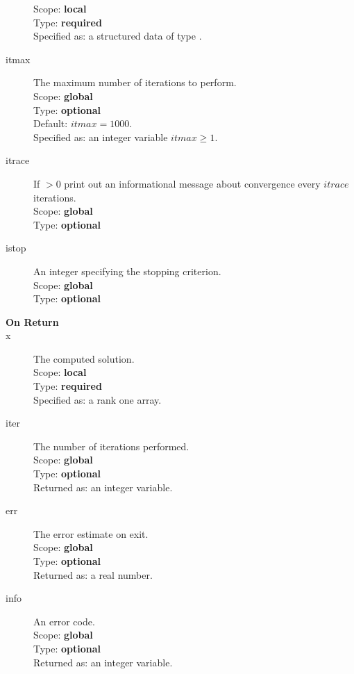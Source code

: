 \begin{description}
Scope: {\bf local} \\
Type: {\bf required}\\
Specified as: a structured data of type \descdata.
\item[itmax]  The maximum number of iterations to perform.\\
Scope: {\bf global} \\
Type: {\bf optional}\\
Default: $itmax = 1000$.\\
Specified as: an integer variable $itmax \ge 1$.
\item[itrace] If $>0$  print out an informational message about
  convergence  every $itrace$ iterations.\\ 
Scope: {\bf global} \\
Type: {\bf optional}\\
\item[istop]  An integer specifying the stopping criterion.\\
Scope: {\bf global} \\
Type: {\bf optional}\\

\item[\bf On Return] 
\item[x] The computed solution. \\
Scope: {\bf local} \\
Type: {\bf required}\\
Specified as: a rank one array.
\item[iter]  The number of iterations performed.\\
Scope: {\bf global} \\
Type: {\bf optional}\\
Returned  as: an integer variable.
\item[err]  The error estimate on exit.\\
Scope: {\bf global} \\
Type: {\bf optional}\\
Returned  as: a real number.
\item[info]  An error code.\\
Scope: {\bf global} \\
Type: {\bf optional}\\
Returned  as: an integer variable.
\end{description}

%
%

